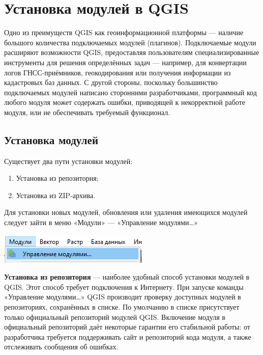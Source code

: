 \documentclass[
  12pt,
]{book}
\begin{document}
\hypertarget{manual-plugins}{%
\chapter{Установка модулей в QGIS}\label{manual-plugins}}

Одно из преимуществ QGIS как геоинформационной платформы --- наличие большого количества подключаемых модулей (плагинов). Подключаемые модули расширяют возможности QGIS, предоставляя пользователям специализированные инструменты для решения определённых задач --- например, для конвертации логов ГНСС-приёмников, геокодирования или получения информации из кадастровых баз данных. С другой стороны, поскольку большинство подключаемых модулей написано сторонними разработчиками, программный код любого модуля может содержать ошибки, приводящей к некорректной работе модуля, или не обеспечивать требуемый функционал.

\hypertarget{manual-plugins-install}{%
\section{Установка модулей}\label{manual-plugins-install}}

Существует два пути установки модулей:

\begin{enumerate}
\def\labelenumi{\arabic{enumi}.}
\item
  Установка из репозитория;
\item
  Установка из ZIP-архива.
\end{enumerate}

Для установки новых модулей, обновления или удаления имеющихся модулей следует зайти в меню «Модули» --- «Управление модулями\ldots»

\includegraphics{images/Man02_InstallModules/Modules01.png}

\textbf{Установка из репозитория} --- наиболее удобный способ установки модулей в QGIS. Этот способ требует подключения к Интернету. При запуске команды «Управление модулями\ldots» QGIS производит проверку доступных модулей в репозиториях, сохранённых в списке. По умолчанию в списке присутствует только официальный репозиторий модулей QGIS. Включение модуля в официальный репозиторий даёт некоторые гарантии его стабильной работы: от разработчика требуется поддерживать сайт и репозиторий кода модуля, а также отслеживать сообщения об ошибках.
\end{document}
